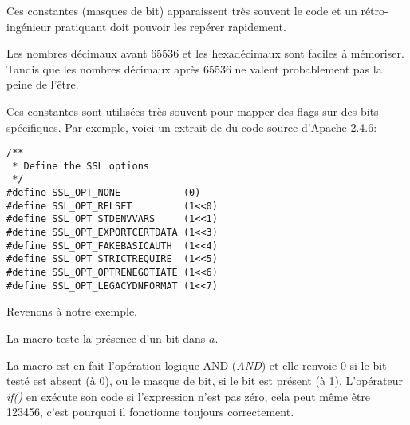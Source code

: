 Ces constantes (masques de bit) apparaissent très souvent le code et un rétro-ingénieur
pratiquant doit pouvoir les repérer rapidement.

Les nombres décimaux avant 65536 et les hexadécimaux sont faciles à mémoriser.
Tandis que les nombres décimaux après 65536 ne valent probablement pas la peine de
l'être.

Ces constantes sont utilisées très souvent pour mapper des flags sur des bits spécifiques.
Par exemple, voici un extrait de  du code source d'Apache 2.4.6:

\begin{lstlisting}[style=customc]
/**
 * Define the SSL options
 */
#define SSL_OPT_NONE           (0)
#define SSL_OPT_RELSET         (1<<0)
#define SSL_OPT_STDENVVARS     (1<<1)
#define SSL_OPT_EXPORTCERTDATA (1<<3)
#define SSL_OPT_FAKEBASICAUTH  (1<<4)
#define SSL_OPT_STRICTREQUIRE  (1<<5)
#define SSL_OPT_OPTRENEGOTIATE (1<<6)
#define SSL_OPT_LEGACYDNFORMAT (1<<7)
\end{lstlisting}

Revenons à notre exemple.

La macro  teste la présence d'un bit dans $a$.

La macro  est en fait l'opération logique AND (\emph{AND}) et elle renvoie
0 si le bit testé est absent (à 0), ou le masque de bit, si le bit est présent (à 1).
L'opérateur \emph{if()} en \CCpp exécute son code si l'expression n'est pas zéro,
cela peut même être 123456, c'est pourquoi il fonctionne toujours correctement.





